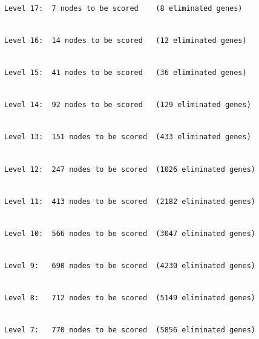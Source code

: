 \documentclass[]{article}
\begin{document}
\begin{verbatim}

     Level 17:  7 nodes to be scored    (8 eliminated genes)
\end{verbatim}

\begin{verbatim}

     Level 16:  14 nodes to be scored   (12 eliminated genes)
\end{verbatim}

\begin{verbatim}

     Level 15:  41 nodes to be scored   (36 eliminated genes)
\end{verbatim}

\begin{verbatim}

     Level 14:  92 nodes to be scored   (129 eliminated genes)
\end{verbatim}

\begin{verbatim}

     Level 13:  151 nodes to be scored  (433 eliminated genes)
\end{verbatim}

\begin{verbatim}

     Level 12:  247 nodes to be scored  (1026 eliminated genes)
\end{verbatim}

\begin{verbatim}

     Level 11:  413 nodes to be scored  (2182 eliminated genes)
\end{verbatim}

\begin{verbatim}

     Level 10:  566 nodes to be scored  (3047 eliminated genes)
\end{verbatim}

\begin{verbatim}

     Level 9:   690 nodes to be scored  (4230 eliminated genes)
\end{verbatim}

\begin{verbatim}

     Level 8:   712 nodes to be scored  (5149 eliminated genes)
\end{verbatim}

\begin{verbatim}

     Level 7:   770 nodes to be scored  (5856 eliminated genes)
\end{verbatim}
\end{document}
